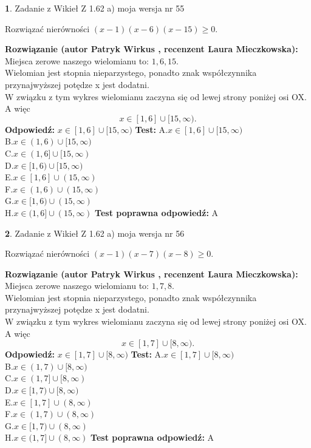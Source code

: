 \documentclass[12pt, a4paper]{article}
\theoremstyle{definition} %
\newtheorem{zad}{}
\newcommand{\zadStart}[1]{\begin{zad}#1\newline}
\newcommand{\zadStop}{\end{zad}}
\newcommand{\rozwStart}[2]{\noindent \textbf{Rozwiązanie (autor #1 , recenzent #2): }\newline}
\newcommand{\rozwStop}{\newline}
\newcommand{\odpStart}{\noindent \textbf{Odpowiedź:}\newline}
\newcommand{\odpStop}{\newline}
\newcommand{\testStart}{\noindent \textbf{Test:}\newline}
\newcommand{\testStop}{\newline}
\newcommand{\kluczStart}{\noindent \textbf{Test poprawna odpowiedź:}\newline}
\newcommand{\kluczStop}{\newline}
\begin{document}
\zadStart{Zadanie z Wikieł Z 1.62 a) moja wersja nr 55}

Rozwiązać nierówności $(x-1)(x-6)(x-15)\ge0$.
\zadStop
\rozwStart{Patryk Wirkus}{Laura Mieczkowska}
Miejsca zerowe naszego wielomianu to: $1, 6, 15$.\\
Wielomian jest stopnia nieparzystego, ponadto znak współczynnika przy\linebreak najwyższej potędze x jest dodatni.\\ W związku z tym wykres wielomianu zaczyna się od lewej strony poniżej osi OX. A więc $$x \in [1,6] \cup [15,\infty).$$
\rozwStop
\odpStart
$x \in [1,6] \cup [15,\infty)$
\odpStop
\testStart
A.$x \in [1,6] \cup [15,\infty)$\\
B.$x \in (1,6) \cup [15,\infty)$\\
C.$x \in (1,6] \cup [15,\infty)$\\
D.$x \in [1,6) \cup [15,\infty)$\\
E.$x \in [1,6] \cup (15,\infty)$\\
F.$x \in (1,6) \cup (15,\infty)$\\
G.$x \in [1,6) \cup (15,\infty)$\\
H.$x \in (1,6] \cup (15,\infty)$
\testStop
\kluczStart
A
\kluczStop



\zadStart{Zadanie z Wikieł Z 1.62 a) moja wersja nr 56}

Rozwiązać nierówności $(x-1)(x-7)(x-8)\ge0$.
\zadStop
\rozwStart{Patryk Wirkus}{Laura Mieczkowska}
Miejsca zerowe naszego wielomianu to: $1, 7, 8$.\\
Wielomian jest stopnia nieparzystego, ponadto znak współczynnika przy\linebreak najwyższej potędze x jest dodatni.\\ W związku z tym wykres wielomianu zaczyna się od lewej strony poniżej osi OX. A więc $$x \in [1,7] \cup [8,\infty).$$
\rozwStop
\odpStart
$x \in [1,7] \cup [8,\infty)$
\odpStop
\testStart
A.$x \in [1,7] \cup [8,\infty)$\\
B.$x \in (1,7) \cup [8,\infty)$\\
C.$x \in (1,7] \cup [8,\infty)$\\
D.$x \in [1,7) \cup [8,\infty)$\\
E.$x \in [1,7] \cup (8,\infty)$\\
F.$x \in (1,7) \cup (8,\infty)$\\
G.$x \in [1,7) \cup (8,\infty)$\\
H.$x \in (1,7] \cup (8,\infty)$
\testStop
\kluczStart
A
\kluczStop
\end{document}
